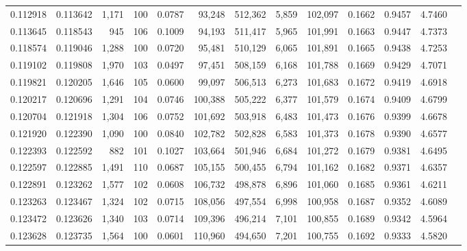 \begin{tabular}{rrrrrrrrrrrrr}
0.112918 & 0.113642 & 1,171 & 100 &                                     0.0787 &  93,248 & 512,362 &   5,859 & 102,097 & 0.1662 & 0.9457 & 4.7460 \\
0.113645 & 0.118543 &   945 & 106 &                                     0.1009 &  94,193 & 511,417 &   5,965 & 101,991 & 0.1663 & 0.9447 & 4.7373 \\
0.118574 & 0.119046 & 1,288 & 100 &                                     0.0720 &  95,481 & 510,129 &   6,065 & 101,891 & 0.1665 & 0.9438 & 4.7253 \\
0.119102 & 0.119808 & 1,970 & 103 &                                     0.0497 &  97,451 & 508,159 &   6,168 & 101,788 & 0.1669 & 0.9429 & 4.7071 \\
0.119821 & 0.120205 & 1,646 & 105 &                                     0.0600 &  99,097 & 506,513 &   6,273 & 101,683 & 0.1672 & 0.9419 & 4.6918 \\
0.120217 & 0.120696 & 1,291 & 104 &                                     0.0746 & 100,388 & 505,222 &   6,377 & 101,579 & 0.1674 & 0.9409 & 4.6799 \\
0.120704 & 0.121918 & 1,304 & 106 &                                     0.0752 & 101,692 & 503,918 &   6,483 & 101,473 & 0.1676 & 0.9399 & 4.6678 \\
0.121920 & 0.122390 & 1,090 & 100 &                                     0.0840 & 102,782 & 502,828 &   6,583 & 101,373 & 0.1678 & 0.9390 & 4.6577 \\
0.122393 & 0.122592 &   882 & 101 &                                     0.1027 & 103,664 & 501,946 &   6,684 & 101,272 & 0.1679 & 0.9381 & 4.6495 \\
0.122597 & 0.122885 & 1,491 & 110 &                                     0.0687 & 105,155 & 500,455 &   6,794 & 101,162 & 0.1682 & 0.9371 & 4.6357 \\
0.122891 & 0.123262 & 1,577 & 102 &                                     0.0608 & 106,732 & 498,878 &   6,896 & 101,060 & 0.1685 & 0.9361 & 4.6211 \\
0.123263 & 0.123467 & 1,324 & 102 &                                     0.0715 & 108,056 & 497,554 &   6,998 & 100,958 & 0.1687 & 0.9352 & 4.6089 \\
0.123472 & 0.123626 & 1,340 & 103 &                                     0.0714 & 109,396 & 496,214 &   7,101 & 100,855 & 0.1689 & 0.9342 & 4.5964 \\
0.123628 & 0.123735 & 1,564 & 100 &                                     0.0601 & 110,960 & 494,650 &   7,201 & 100,755 & 0.1692 & 0.9333 & 4.5820 \\

\end{tabular}
